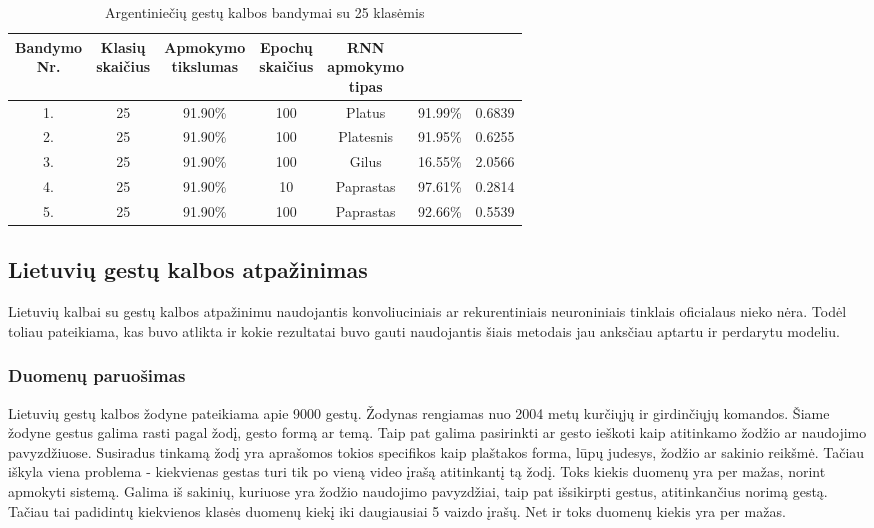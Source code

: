 \documentclass{VUMIFPSbakalaurinis}
\begin{document}
\begin{table}[H]\footnotesize
	\centering
	\caption{Argentiniečių gestų kalbos bandymai su 25 klasėmis}
	{\begin{tabular}{| c | c | c | c | c | c | c |} \hline
		\thead{Bandymo\\Nr.} & \thead{Klasių\\skaičius} & \thead{Apmokymo\\tikslumas} & \thead{Epochų\\skaičius} & \thead{RNN\\apmokymo\\tipas} & \thead{Tikslumas} & \thead{Praradimas}  \\
		\hline
		1. & 25 & 91.90\% & 100 & Platus & 91.99\% & 0.6839 \\
		\hline
		2. & 25 & 91.90\% & 100 & Platesnis & 91.95\% & 0.6255 \\
		\hline
		3. & 25 & 91.90\% & 100 & Gilus & 16.55\% & 2.0566 \\
		\hline
		4. & 25 & 91.90\% & 10 & Paprastas & 97.61\% & 0.2814 \\
		\hline
		5. & 25 & 91.90\% & 100 & Paprastas & 92.66\% & 0.5539 \\
		\hline
	\end{tabular}}
	\label{tab:asl-bandymai2}
\end{table}


\subsection{Lietuvių gestų kalbos atpažinimas}

Lietuvių kalbai su gestų kalbos atpažinimu naudojantis konvoliuciniais ar rekurentiniais neuroniniais tinklais oficialaus nieko nėra. Todėl toliau pateikiama, kas buvo atlikta ir kokie rezultatai buvo gauti naudojantis šiais metodais jau anksčiau aptartu ir perdarytu modeliu. 

\subsubsection{Duomenų paruošimas}
Lietuvių gestų kalbos žodyne pateikiama apie 9000 gestų. Žodynas rengiamas nuo 2004 metų kurčiųjų ir girdinčiųjų komandos. Šiame žodyne gestus galima rasti pagal žodį, gesto formą ar temą. Taip pat galima pasirinkti ar gesto ieškoti kaip atitinkamo žodžio ar naudojimo pavyzdžiuose. Susiradus tinkamą žodį yra aprašomos tokios specifikos kaip plaštakos forma, lūpų judesys, žodžio ar sakinio reikšmė. Tačiau iškyla viena problema - kiekvienas gestas turi tik po vieną video įrašą atitinkantį tą žodį. Toks kiekis duomenų yra per mažas, norint apmokyti sistemą. Galima iš sakinių, kuriuose yra žodžio naudojimo pavyzdžiai, taip pat išsikirpti gestus, atitinkančius norimą gestą. Tačiau tai padidintų kiekvienos klasės duomenų kiekį iki daugiausiai 5 vaizdo įrašų. Net ir toks duomenų kiekis yra per mažas.
\end{document}
